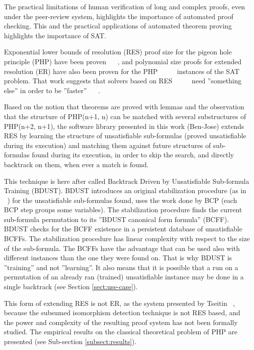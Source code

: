 \documentclass{easychair}
\begin{document}
The practical limitations of human verification of long and complex proofs, even under the peer-review system, highlights the importance of automated proof checking. This and the practical applications of automated theorem proving ~\cite{cadar-08} highlights the importance of SAT.

Exponential lower bounds of resolution (RES) proof size for the pigeon hole principle (PHP) have been proven ~\cite{haken-85} ~\cite{buss-88}, and polynomial size proofs for extended resolution (ER) have also been proven for the PHP  ~\cite{cook-76} ~\cite{cook-79} ~\cite{jarvisalo-07} instances of the SAT problem. That work suggests that solvers based on RES ~\cite{silva-95} ~\cite{moskewicz-01} ~\cite{een-04} need ''something else'' in order to be ''faster'' ~\cite{dixon-04} ~\cite{audemard-10}. 

Based on the notion that theorems are proved with lemmas and the observation that the structure of PHP(n+1, n) can be matched with several substructures of PHP(n+2, n+1), the software library presented in this work (Ben-Jose) extends RES by learning the structure of unsatisfiable sub-formulas (proved unsatisfiable during its execution) and matching them against future structures of sub-formulas found during its execution, in order to skip the search, and directly backtrack on them, when ever a match is found. 

This technique is here after called Backtrack Driven by Unsatisfiable Sub-formula Training (BDUST). BDUST introduces an original stabilization procedure (as in ~\cite{bastert-02}) for the unsatisfiable sub-formulas found, uses the work done by BCP (each BCP step groups some variables). The stabilization procedure finds the current sub-formula permutation to its ''BDUST canonical form formula'' (BCFF). BDUST checks for the BCFF existence in a persistent database of unsatisfiable BCFFs. The stabilization procedure has linear complexity with respect to the size of the sub-formula. The BCFFs have the advantage that can be used also with different instances than the one they were found on. That is why BDUST is ''training'' and not ''learning''. It also means that it is possible that a run on a permutation of an already ran (trained) unsatisfiable instance may be done in a single backtrack (see Section \ref{sect:use-case}).

This form of extending RES is not ER, as the system presented by Tseitin ~\cite{tseitin-83}, because the subsumed isomorphism detection technique is not RES based, and the power and complexity of the resulting proof system has not been formally studied. The empirical results on the classical theoretical problem of PHP are presented (see Sub-section \ref{subsect:results}). 
\end{document}
